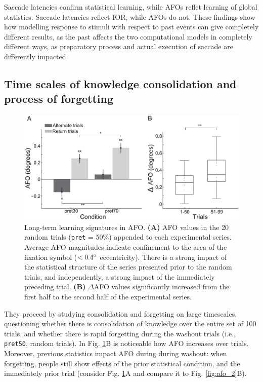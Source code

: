 Saccade latencies confirm statistical learning, while AFOs reflct learning of global statistics. Saccade latencies reflect IOR, while AFOs do not. 
These findings show how modelling response to stimuli with respect to past events can give completely different results, as the past affects the two computational models in completely different ways, as preparatory process and actual execution of saccade are differently impacted.

\subsection{Time scales of knowledge consolidation and process of forgetting}

\begin{figure}[!ht]
    \centering
    \captionsetup{width=.8\linewidth}
    \includegraphics[width=0.55\linewidth]{images/afo_3.png}
    \caption{Long-term learning signatures in AFO. \textbf{(A)} AFO values in the 20 random trials (\texttt{pret} = 50\%) appended to each experimental series. Average AFO magnitudes indicate confinement to the area of the fixation symbol ($<0.4\degree$ eccentricity). There is a strong impact of the statistical structure of the series presented prior to the random trials, and independently, a strong impact of the immediately preceding trial. \textbf{(B)} $\Delta$AFO values significantly increased from the first half to the second half of the experimental series.}
    \label{fig:afo_3}
\end{figure}

They proceed by studying consolidation and forgetting on large timescales, questioning whether there is consolidation of knowledge over the entire set of 100 trials, and whether there is rapid forgetting during the washout trials (i.e., \texttt{pret50}, random trials). In Fig. \ref{fig:afo_3}B is noticeable how AFO increases over trials.
Moreover, previous statistics impact AFO during during washout: when forgetting, people still show effects of the prior statistical condition, and the immediately prior trial (consider Fig. \ref{fig:afo_3}A and compare it to Fig. \ref{fig:afo_2}B).

